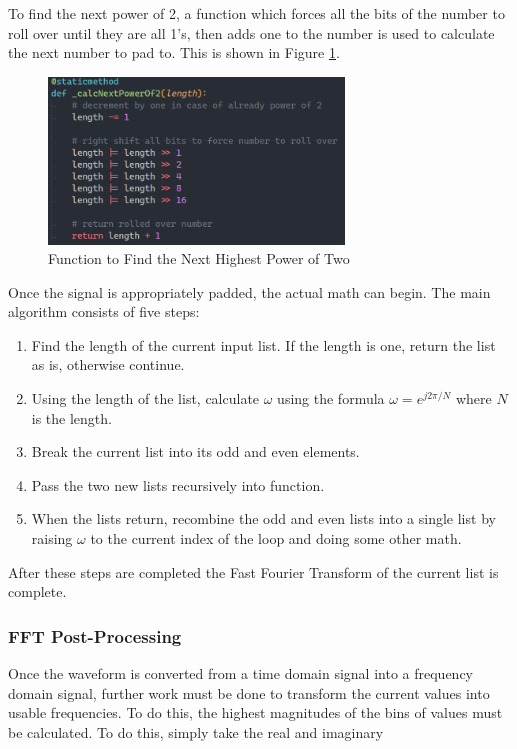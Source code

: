 \documentclass[UTF8, 12pt]{article}
\begin{document}
    To find the next power of 2, a function which forces all the bits of the number to roll over until they are all 1's, then adds one to the number is used to calculate the next number to pad to. This is shown in Figure \ref{calc2_fig}.
    \begin{figure}[h!]
        \centering
        \includegraphics[width=0.7\textwidth]{calc2.png}
        \caption{Function to Find the Next Highest Power of Two}
        \label{calc2_fig}
    \end{figure}
    Once the signal is appropriately padded, the actual math can begin. The main algorithm consists of five steps:
    \newpage
    \begin{enumerate}
        \item Find the length of the current input list. If the length is one, return the list as is, otherwise continue.
        \item Using the length of the list, calculate $\omega$ using the formula $\omega = e^{j2\pi/N}$ where $N$ is the length.
        \item Break the current list into its odd and even elements.
        \item Pass the two new lists recursively into function.
        \item When the lists return, recombine the odd and even lists into a single list by raising $\omega$ to the current index of the loop and doing some other math.
    \end{enumerate}
    After these steps are completed the Fast Fourier Transform of the current list is complete.

\subsubsection{FFT Post-Processing}
    Once the waveform is converted from a time domain signal into a frequency domain signal, further work must be done to transform the current values into usable frequencies. To do this, the highest magnitudes of the bins of values must be calculated. To do this, simply take the real and imaginary 

\newpage
\printbibliography
\end{document}
